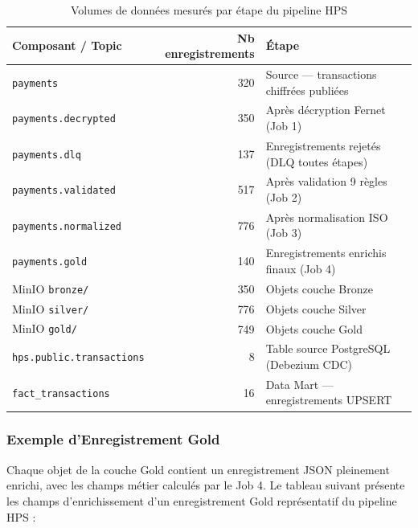 \vspace{0.3cm}
\begin{table}[H]
\centering
\renewcommand{\arraystretch}{1.5}
\begin{tabular}{|l|r|l|}
\hline
\textbf{Composant / Topic} & \textbf{Nb enregistrements} & \textbf{Étape} \\
\hline
\texttt{payments}              & 320  & Source --- transactions chiffrées publiées \\
\texttt{payments.decrypted}    & 350  & Après décryption Fernet (Job 1) \\
\texttt{payments.dlq}          & 137  & Enregistrements rejetés (DLQ toutes étapes) \\
\texttt{payments.validated}    & 517  & Après validation 9 règles (Job 2) \\
\texttt{payments.normalized}   & 776  & Après normalisation ISO (Job 3) \\
\texttt{payments.gold}         & 140  & Enregistrements enrichis finaux (Job 4) \\
\hline
MinIO \texttt{bronze/}         & 350  & Objets couche Bronze \\
MinIO \texttt{silver/}         & 776  & Objets couche Silver \\
MinIO \texttt{gold/}           & 749  & Objets couche Gold \\
\hline
\texttt{hps.public.transactions} & 8  & Table source PostgreSQL (Debezium CDC) \\
\texttt{fact\_transactions}    & 16   & Data Mart --- enregistrements UPSERT \\
\hline
\end{tabular}
\caption{Volumes de données mesurés par étape du pipeline HPS}
\label{tab:volumes}
\end{table}

\subsubsection{Exemple d'Enregistrement Gold}
\vspace{0.3cm}

Chaque objet de la couche Gold contient un enregistrement JSON pleinement enrichi, avec les champs métier calculés par le Job 4. Le tableau suivant présente les champs d'enrichissement d'un enregistrement Gold représentatif du pipeline HPS :


